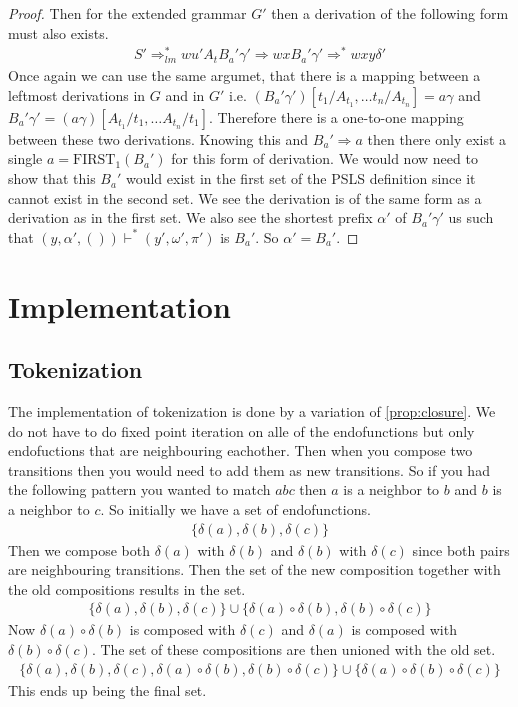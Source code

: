 \documentclass[a4paper,12pt]{article}
\theoremstyle{definition}
\begin{document}
\begin{proof}
  Then for the extended grammar $G'$ then a derivation of the following form must also exists.
  \begin{align*}
    S' \Rightarrow^*_{lm} wu'A_tB_a'\gamma' \Rightarrow wxB_a'\gamma' \Rightarrow^* wxy\delta'
  \end{align*}
  Once again we can use the same argumet, that there is a mapping between a leftmost derivations in $G$ and in $G'$ i.e. $(B_a'\gamma')[t_1/A_{t_1}, \dots t_n/A_{t_n}] = a\gamma$ and $B_a'\gamma' = (a\gamma)[A_{t_1}/t_1, \dots A_{t_n}/t_1]$. Therefore there is a one-to-one mapping between these two derivations. Knowing this and $B_a' \Rightarrow a$ then there only exist a single $a = \text{FIRST}_1(B_a')$ for this form of derivation. We would now need to show that this $B_a'$ would exist in the first set of the PSLS definition since it cannot exist in the second set. We see the derivation is of the same form as a derivation as in the first set. We also see the shortest prefix $\alpha'$ of $B_a'\gamma'$ us such that $(y, \alpha', ()) \vdash^* (y', \omega', \pi')$ is $B_a'$. So $\alpha' = B_a'$.
\end{proof}

\section{Implementation}
\subsection{Tokenization}
The implementation of tokenization is done by a variation of \ref{prop:closure}. We do not have to do fixed point iteration on alle of the endofunctions but only endofuctions that are neighbouring eachother. Then when you compose two transitions then you would need to add them as new transitions. So if you had the following pattern you wanted to match $abc$ then $a$ is a neighbor to $b$ and $b$ is a neighbor to $c$. So initially we have a set of endofunctions.
\begin{align*}
  \{\delta(a), \delta(b), \delta(c)\}
\end{align*}
Then we compose both $\delta(a)$ with $\delta(b)$ and $\delta(b)$ with $\delta(c)$ since both pairs are neighbouring transitions. Then the set of the new composition together with the old compositions results in the set.
\begin{align*}
  \{\delta(a), \delta(b), \delta(c)\} \cup \{\delta(a) \circ \delta(b), \delta(b) \circ \delta(c)\}
\end{align*}
Now $\delta(a) \circ \delta(b)$ is composed with $\delta(c)$ and $\delta(a)$ is composed with $\delta(b) \circ \delta(c)$. The set of these compositions are then unioned with the old set.
\begin{align*}
  \{\delta(a), \delta(b), \delta(c), \delta(a) \circ \delta(b), \delta(b) \circ \delta(c)\} \cup \{\delta(a) \circ \delta(b) \circ \delta(c)\}
\end{align*}
This ends up being the final set.
\end{document}
